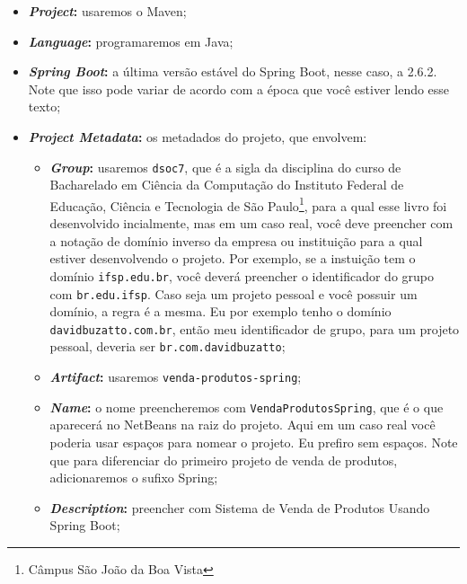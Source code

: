 \begin{itemize}

    \item \textbf{\textit{Project}:} usaremos o Maven;
    
    \item \textbf{\textit{Language}:} programaremos em Java;
    
    \item \textbf{\textit{Spring Boot}:} a última versão estável do Spring Boot, nesse caso, a 2.6.2. Note que isso pode variar de acordo com a época que você estiver lendo esse texto;
    
    \item \textbf{\textit{Project Metadata}:} os metadados do projeto, que envolvem:
    
    \begin{itemize}
    
        \item \textbf{\textit{Group}:} usaremos \texttt{dsoc7}, que é a sigla da disciplina do curso de Bacharelado em Ciência da Computação do Instituto Federal de Educação, Ciência e Tecnologia de São Paulo\footnote{Câmpus São João da Boa Vista}, para a qual esse livro foi desenvolvido incialmente, mas em um caso real, você deve preencher com a notação de domínio inverso da empresa ou instituição para a qual estiver desenvolvendo o projeto. Por exemplo, se a instuição tem o domínio \texttt{ifsp.edu.br}, você deverá preencher o identificador do grupo com \texttt{br.edu.ifsp}. Caso seja um projeto pessoal e você possuir um domínio, a regra é a mesma. Eu por exemplo tenho o domínio \texttt{davidbuzatto.com.br}, então meu identificador de grupo, para um projeto pessoal, deveria ser \texttt{br.com.davidbuzatto};
        
        \item \textbf{\textit{Artifact}:} usaremos \texttt{venda-produtos-spring};
        
        \item \textbf{\textit{Name}:} o nome preencheremos com \texttt{VendaProdutosSpring}, que é o que aparecerá no NetBeans na raiz do projeto. Aqui em um caso real você poderia usar espaços para nomear o projeto. Eu prefiro sem espaços. Note que para diferenciar do primeiro projeto de venda de produtos, adicionaremos o sufixo Spring;
        
        \item \textbf{\textit{Description}:} preencher com Sistema de Venda de Produtos Usando Spring Boot;
        

\end{itemize}
\end{itemize}
